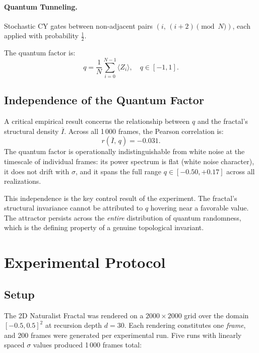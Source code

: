 \documentclass[twocolumn,amsmath,amssymb,prl]{revtex4-2}
\begin{document}
\paragraph{Quantum Tunneling.}
Stochastic CY gates between non-adjacent pairs $(i,\,(i+2)\!\!\pmod{N})$,
each applied with probability $\frac{1}{2}$.

The quantum factor is:
\begin{equation}
  q = \frac{1}{N}\sum_{i=0}^{N-1} \langle Z_i \rangle,
  \quad q \in [-1, 1].
\end{equation}

\subsection{Independence of the Quantum Factor}

A critical empirical result concerns the relationship between $q$ and the
fractal's structural density $\overline{I}$.  Across all 1\,000 frames,
the Pearson correlation is:
\begin{equation}
  r(\overline{I},\, q) = -0.031.
\end{equation}
The quantum factor is operationally indistinguishable from white noise at the
timescale of individual frames: its power spectrum is flat (white noise
character), it does not drift with $\sigma$, and it spans the full range
$q \in [-0.50, +0.17]$ across all realizations.

This independence is the key control result of the experiment.  The fractal's
structural invariance cannot be attributed to $q$ hovering near a favorable
value.  The attractor persists across the \emph{entire} distribution of
quantum randomness, which is the defining property of a genuine topological
invariant.

\section{Experimental Protocol}
\label{sec:protocol}

\subsection{Setup}

The 2D Naturalist Fractal was rendered on a $2000 \times 2000$ grid over the
domain $[-0.5, 0.5]^2$ at recursion depth $d = 30$.  Each rendering
constitutes one \emph{frame}, and 200 frames were generated per experimental
run.  Five runs with linearly spaced $\sigma$ values produced 1\,000 frames
total:
\end{document}
